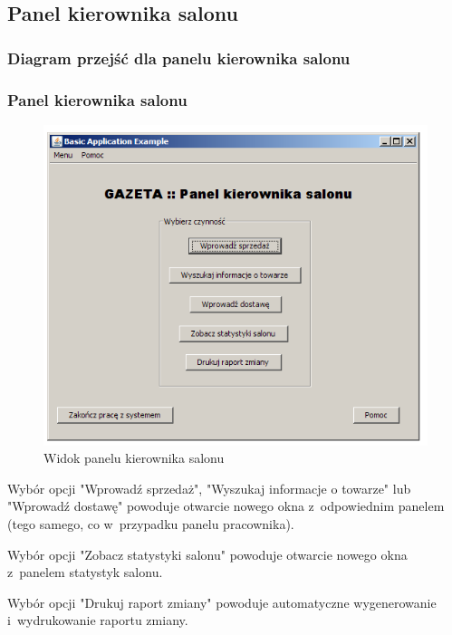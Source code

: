 \subsection{Panel kierownika salonu}
\subsubsection{Diagram przejść dla panelu kierownika salonu}
\clearpage
\subsubsection{Panel kierownika salonu}
\begin{figure}[h]
\includegraphics[width=1\textwidth]{gfx/kierownik.png}
\caption{Widok panelu kierownika salonu}
\end{figure}
Wybór opcji "Wprowadź sprzedaż", "Wyszukaj informacje o towarze" lub "Wprowadź dostawę" powoduje otwarcie nowego okna z~odpowiednim panelem (tego samego, co w~przypadku panelu pracownika).

Wybór opcji "Zobacz statystyki salonu" powoduje otwarcie nowego okna z~panelem statystyk salonu.

Wybór opcji "Drukuj raport zmiany" powoduje automatyczne wygenerowanie i~wydrukowanie raportu zmiany.
\clearpage
